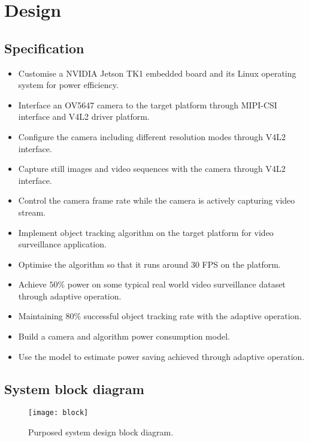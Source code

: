 \chapter{Design} \label{Chapter:Design}

\section{Specification}


\begin{itemize}
	\setlength\itemsep{0em}
	\item Customise a NVIDIA Jetson TK1 embedded board and its Linux operating system for power efficiency.
	\item Interface an OV5647 camera to the target platform through MIPI-CSI interface and V4L2 driver platform.
	\item Configure the camera including different resolution modes through V4L2 interface.
	\item Capture still images and video sequences with the camera through V4L2 interface.
	\item Control the camera frame rate while the camera is actively capturing video stream.
	\item Implement object tracking algorithm on the target platform for video surveillance application.
	\item Optimise the algorithm so that it runs around $30$ FPS on the platform.
	\item Achieve $50\%$ power  on some typical real world video surveillance dataset through adaptive operation.
	\item Maintaining $80\%$ successful object tracking rate with the adaptive operation.
	\item Build a camera and algorithm power consumption model.
	\item Use the model to estimate power saving achieved through adaptive operation.
\end{itemize}

\section{System block diagram}

\begin{figure}[H]
  \centering
  \texttt{[image: block]}
  \caption{Purposed system design block diagram.}
  \label{block}
\end{figure}

